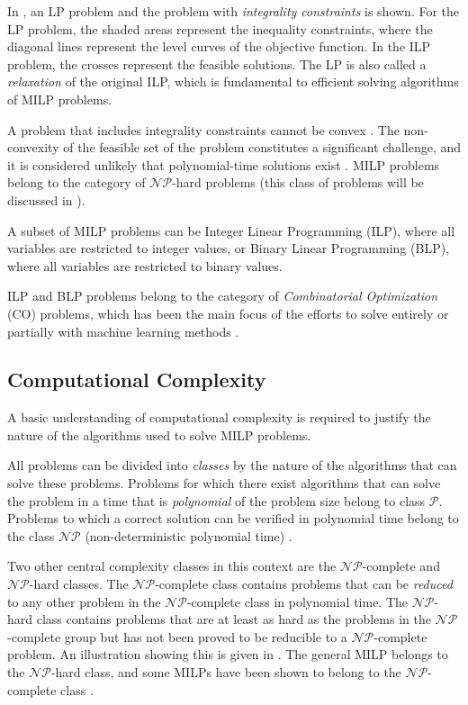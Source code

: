 In , an \gls{LP} problem and the problem with \textit{integrality constraints} is shown. For the \gls{LP} problem, the shaded areas represent the inequality constraints, where the diagonal lines represent the level curves of the objective function. In the \gls{ILP} problem, the crosses represent the feasible solutions. The \gls{LP} is also called a \textit{relaxation} of the original \gls{ILP}, which is fundamental to efficient solving algorithms of \gls{MILP} problems.

A problem that includes integrality constraints cannot be convex \cite{wolsey2020integer}. The non-convexity of the feasible set of the problem constitutes a significant challenge, and it is considered unlikely that polynomial-time solutions exist \cite{papadimitriou1982combinatorial}. \gls{MILP} problems belong to the category of $\mathcal{NP}$-hard problems \cite{papadimitriou1982combinatorial} (this class of problems will be discussed in ).   

A subset of \gls{MILP} problems can be Integer Linear Programming (\gls{ILP}), where all variables are restricted to integer values, or Binary Linear Programming (\gls{BLP}), where all variables are restricted to binary values. 

\gls{ILP} and \gls{BLP} problems belong to the category of \textit{Combinatorial Optimization} (\gls{CO}) problems, which has been the main focus of the efforts to solve entirely or partially with machine learning methods \cite{bengio2020machine}. 




\subsection{Computational Complexity}\label{ssec:complexity}

A basic understanding of computational complexity is required to justify the nature of the algorithms used to solve \gls{MILP} problems. 

All problems can be divided into \textit{classes} by the nature of the algorithms that can solve these problems. Problems for which there exist algorithms that can solve the problem in a time that is \textit{polynomial} of the problem size belong to class $\mathcal{P}$. Problems to which a correct solution can be verified in polynomial time belong to the class $\mathcal{NP}$ (non-deterministic polynomial time) \cite{cormen2009introduction}. 


Two other central complexity classes in this context are the $\mathcal{NP}$-complete and $\mathcal{NP}$-hard classes. The $\mathcal{NP}$-complete class contains problems that can be \textit{reduced} to any other problem in the $\mathcal{NP}$-complete class in polynomial time. 
The $\mathcal{NP}$-hard class contains problems that are at least as hard as the problems in the $\mathcal{NP}$-complete group but has not been proved to be reducible to a $\mathcal{NP}$-complete problem. An illustration showing this is given in . The general \gls{MILP} belongs to the $\mathcal{NP}$-hard class, and some \gls{MILP}s have been shown to belong to the $\mathcal{NP}$-complete class \cite{cormen2009introduction}. 


